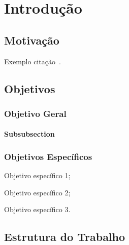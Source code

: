 \chapter{Introdução}
\label{ch:introducao}

\section{Motivação}
\label{sec:motivacao}

Exemplo citação~\cite{lamport1986latex}.

\section{Objetivos}
\label{sec:objetivos}

\subsection{Objetivo Geral}
\label{subsec:objetivo-geral}

\subsubsection{Subsubsection}
\label{subsubsec:subsubsection}

\subsection{Objetivos Específicos}
\label{subsec:objetivos-especificos}
	\begin{alineas}
	    \item Objetivo específico 1;
		\item Objetivo específico 2;
		\item Objetivo específico 3.
	\end{alineas}

\section{E\lowercase{strutura do} T\lowercase{rabalho}}
\label{sec:estrutura-do-trabalho}